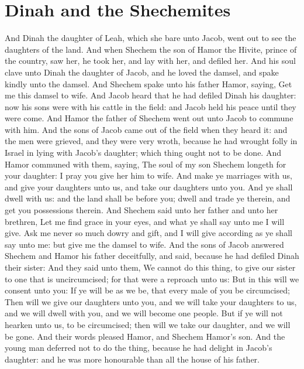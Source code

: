 \section*{Dinah and the Shechemites}
\begin{biblechapter} %
\verse And Dinah the daughter of Leah, which she bare unto Jacob, went out to see the daughters of the land.
\verse And when Shechem the son of Hamor the Hivite, prince of the country, saw her, he took her, and lay with her, and defiled her.
\verse And his soul clave unto Dinah the daughter of Jacob, and he loved the damsel, and spake kindly unto the damsel.
\verse And Shechem spake unto his father Hamor, saying, Get me this damsel to wife.
\verse And Jacob heard that he had defiled Dinah his daughter: now his sons were with his cattle in the field: and Jacob held his peace until they were come.
\verse And Hamor the father of Shechem went out unto Jacob to commune with him.
\verse And the sons of Jacob came out of the field when they heard it: and the men were grieved, and they were very wroth, because he had wrought folly in Israel in lying with Jacob's daughter; which thing ought not to be done.
\verse And Hamor communed with them, saying, The soul of my son Shechem longeth for your daughter: I pray you give her him to wife.
\verse And make ye marriages with us, and give your daughters unto us, and take our daughters unto you.
\verse And ye shall dwell with us: and the land shall be before you; dwell and trade ye therein, and get you possessions therein.
\verse And Shechem said unto her father and unto her brethren, Let me find grace in your eyes, and what ye shall say unto me I will give.
\verse Ask me never so much dowry and gift, and I will give according as ye shall say unto me: but give me the damsel to wife.
\verse And the sons of Jacob answered Shechem and Hamor his father deceitfully, and said, because he had defiled Dinah their sister:
\verse And they said unto them, We cannot do this thing, to give our sister to one that is uncircumcised; for that were a reproach unto us:
\verse But in this will we consent unto you: If ye will be as we be, that every male of you be circumcised;
\verse Then will we give our daughters unto you, and we will take your daughters to us, and we will dwell with you, and we will become one people.
\verse But if ye will not hearken unto us, to be circumcised; then will we take our daughter, and we will be gone.
\verse And their words pleased Hamor, and Shechem Hamor's son.
\verse And the young man deferred not to do the thing, because he had delight in Jacob's daughter: and he was more honourable than all the house of his father.

\end{biblechapter}
